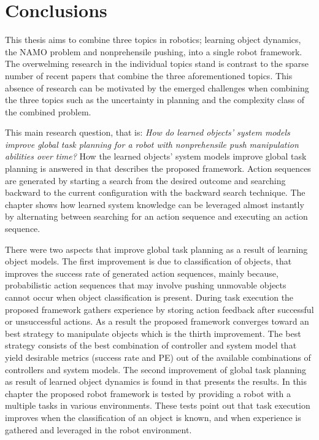\chapter{Conclusions}%
\label{chap:conclusion}
This thesis aims to combine three topics in robotics; learning object dynamics, the \ac{NAMO} problem and nonprehensile pushing, into a single robot framework. The overwelming research in the individual topics stand is contrast to the sparse number of recent papers that combine the three aforementioned topics. This absence of research can be motivated by the emerged challenges when combining the three topics such as the uncertainty in planning and the complexity class of the combined problem.\bs

This main research question, that is: \textit{How do learned objects' system models improve global task planning for a robot with nonprehensile push manipulation abilities over time?} How the learned objects' system models improve global task planning is answered in  that describes the proposed framework. Action sequences are generated by starting a search from the desired outcome and searching backward to the current configuration with the backward search technique. The chapter shows how learned system knowledge can be leveraged almost instantly by alternating between searching for an action sequence and executing an action sequence.\bs

There were two aspects that improve global task planning as a result of learning object models. The first improvement is due to classification of objects, that improves the success rate of generated action sequences, mainly because, probabilistic action sequences that may involve pushing unmovable objects cannot occur when object classification is present. During task execution the proposed framework gathers experience by storing action feedback after successful or unsuccessful actions. As a result the proposed framework converges toward an best strategy to manipulate objects which is the thirth improvement. The best strategy consists of the best combination of controller and system model that yield desirable metrics (success rate and \acl{PE}) out of the available combinations of controllers and system models. The second improvement of global task planning as result of learned object dynamics is found in  that presents the results. In this chapter the proposed robot framework is tested by providing a robot with a multiple tasks in various environments. These tests point out that task execution improves when the classification of an object is known, and when experience is gathered and leveraged in the robot environment.\bs

